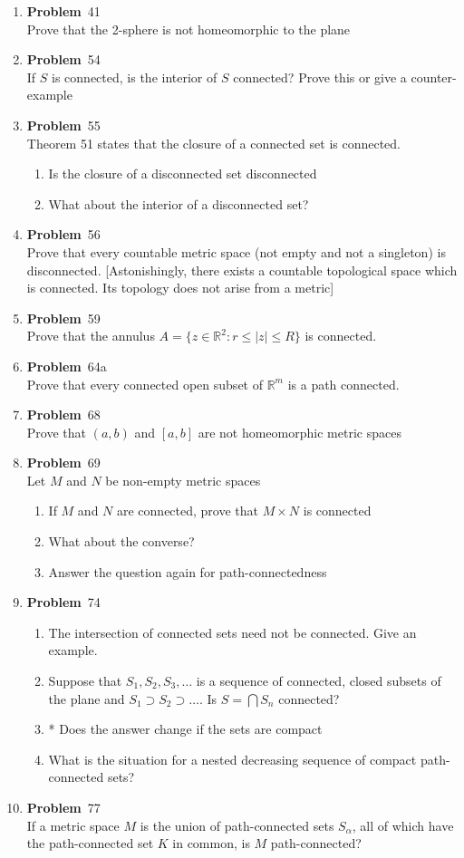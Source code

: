 \documentclass[12pt]{amsart}
\newcommand{\benu}{\begin{enumerate}}
\newcommand{\eenu}{\end{enumerate}}
\theoremstyle{definition}
\newcommand{\mbR}{\mathbb{R}}
\newcommand{\itep}{\item {\bfseries Problem}\ }
\begin{document}
\begin{enumerate}[series=p]
\itep 41\\
Prove that the 2-sphere is not homeomorphic to the plane

\newpage
\itep 54\\
If $S$ is connected, is the interior of $S$ connected?  Prove this or give a counter-example

\newpage

\itep 55\\
Theorem 51 states that the closure of a connected set is connected.
	\benu
		\item Is the closure of a disconnected set disconnected
		\item What about the interior of a disconnected set?
	\eenu
\newpage

\itep 56\\
Prove that every countable metric space (not empty and not a singleton) is disconnected.  [Astonishingly, there exists a countable topological space which is connected.  Its topology does not arise from a metric]

\newpage
\itep 59\\
Prove that the annulus $A = \{z \in \mbR^2: r \leq |z| \leq R\}$ is connected.

\newpage
\itep 64a\\
Prove that every connected open subset of $\mbR^m$ is a path connected.

\newpage
\itep 68\\
Prove that $(a,b)$ and $[a,b]$ are not homeomorphic metric spaces


\newpage

\itep 69\\
Let $M$ and $N$ be non-empty metric spaces
	\benu
		\item If $M$ and $N$ are connected, prove that $M \times N$ is connected
		\item What about the converse?
		\item Answer the question again for path-connectedness
	\eenu
\newpage


\itep 74\\
	\benu
		\item The intersection of connected sets need not be connected.  Give an example.
		\item Suppose that $S_1, S_2, S_3, \dots$ is a sequence of connected, closed subsets of the plane and $S_1 \supset S_2 \supset \dots$.  Is $S = \bigcap S_n$ connected?
		\item * Does the answer change if the sets are compact
		\item What is the situation for a nested decreasing sequence of compact path-connected sets?
	\eenu
\newpage


\itep 77\\
If a metric space $M$ is the union of path-connected sets $S_\alpha$, all of which have the path-connected set $K$ in common, is $M$ path-connected?



\end{enumerate}
\end{document}
